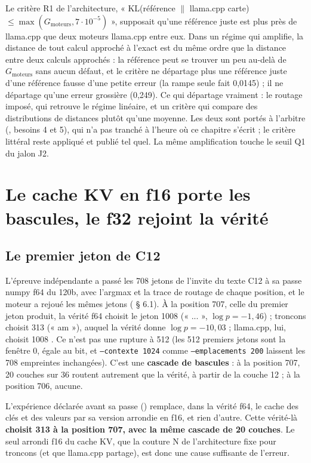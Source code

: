 Le critère R1 de l'architecture, « KL(référence $\|$ llama.cpp carte) $\le \max(G_{\text{moteurs}}, 7\cdot10^{-5})$ », supposait qu'une référence juste est plus près de llama.cpp que deux moteurs llama.cpp entre eux. Dans un régime qui amplifie, la distance de tout calcul approché à l'exact est du même ordre que la distance entre deux calculs approchés : la référence peut se trouver un peu au-delà de $G_{\text{moteurs}}$ sans aucun défaut, et le critère ne départage plus une référence juste d'une référence fausse d'une petite erreur (la rampe seule fait 0,0145) ; il ne départage qu'une erreur grossière (0,249). Ce qui départage vraiment : le routage imposé, qui retrouve le régime linéaire, et un critère qui compare des distributions de distances plutôt qu'une moyenne. Les deux sont portés à l'arbitre (, besoins 4 et 5), qui n'a pas tranché à l'heure où ce chapitre s'écrit ; le critère littéral reste appliqué et publié tel quel. La même amplification touche le seuil Q1 du jalon J2.

\section{Le cache KV en f16 porte les bascules, le f32 rejoint la vérité}\label{sec:t2r-kv}

\subsection{Le premier jeton de C12}\label{sec:t2r-c12}

L'épreuve indépendante a passé les 708 jetons de l'invite du texte C12 à sa passe numpy f64 du 120b, avec l'argmax et la trace de routage de chaque position, et le moteur a rejoué les mêmes jetons ( § 6.1). À la position 707, celle du premier jeton produit, la vérité f64 choisit le jeton 1008 (« ... », $\log p = -1{,}46$) ; troncons choisit 313 (« am »), auquel la vérité donne $\log p = -10{,}03$ ; llama.cpp, lui, choisit 1008 \mes. Ce n'est pas une rupture à 512 (les 512 premiers jetons sont la fenêtre 0, égale au bit, et \texttt{--contexte 1024} comme \texttt{--emplacements 200} laissent les 708 empreintes inchangées). C'est une \textbf{cascade de bascules} : à la position 707, 20 couches sur 36 routent autrement que la vérité, à partir de la couche 12 ; à la position 706, aucune.

L'expérience déclarée avant sa passe () remplace, dans la vérité f64, le cache des clés et des valeurs par sa version arrondie en f16, et rien d'autre. Cette vérité-là \textbf{choisit 313 à la position 707, avec la même cascade de 20 couches}. Le seul arrondi f16 du cache KV, que la couture N de l'architecture fixe pour troncons (et que llama.cpp partage), est donc une cause suffisante de l'erreur.

